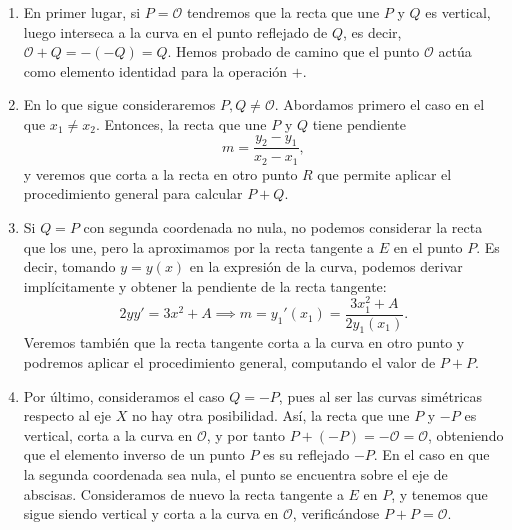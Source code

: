 \documentclass[
  a4paper,
  12pt,
  spanish,
]{scrartcl}
\begin{document}
\begin{enumerate}
  \item En primer lugar, si $P=\mathcal{O}$ tendremos que la recta que une $P$ y $Q$ es vertical, luego interseca a la curva en el punto reflejado de $Q$, es decir, $\mathcal{O} + Q = - (-Q) = Q$. Hemos probado de camino que el punto $\mathcal{O}$ actúa como elemento identidad para la operación $+$.
  \item En lo que sigue consideraremos $P, Q \neq \mathcal{O}$. Abordamos primero el caso en el que $x_1 \neq x_2$. Entonces, la recta que une $P$ y $Q$ tiene pendiente \[ m = \frac{y_2 - y_1}{x_2 - x_1}, \] y veremos que corta a la recta en otro punto $R$ que permite aplicar el procedimiento general para calcular $P+Q$.	
  \item Si $Q = P$ con segunda coordenada no nula, no podemos considerar la recta que los une, pero la aproximamos por la recta tangente a $E$ en el punto $P$. Es decir, tomando $y = y(x)$ en la expresión de la curva, podemos derivar implícitamente y obtener la pendiente de la recta tangente: \[ 2yy' = 3x^2 + A \implies m = y_1'(x_1) = \frac{3x_1^2 + A}{2y_1(x_1)}. \]  Veremos también que la recta tangente corta a la curva en otro punto y podremos aplicar el procedimiento general, computando el valor de $P + P$.
  \item Por último, consideramos el caso $Q = -P$, pues al ser las curvas simétricas respecto al eje $X$ no hay otra posibilidad. Así, la recta que une $P$ y $-P$ es vertical, corta a la curva en $\mathcal{O}$, y por tanto $P + (-P) = -\mathcal{O} = \mathcal{O}$, obteniendo que el elemento inverso de un punto $P$ es su reflejado $-P$. En el caso en que la segunda coordenada sea nula, el punto se encuentra sobre el eje de abscisas. Consideramos de nuevo la recta tangente a $E$ en $P$, y tenemos que sigue siendo vertical y corta a la curva en $\mathcal{O}$, verificándose $P + P = \mathcal{O}$.
\end{enumerate}
\end{document}
